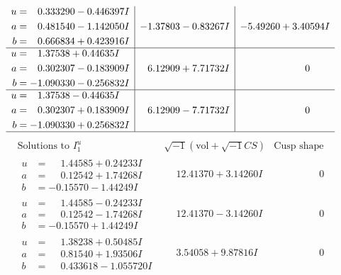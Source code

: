 \documentclass[1p]{elsarticle_modified}
\theoremstyle{definition}
\newcommand{\I}{\sqrt{-1}}
\begin{document}
$$\begin{array}{c|c|c}
\begin{aligned}
u &= \phantom{-}0.333290 - 0.446397 I \\
a &= \phantom{-}0.481540 - 1.142050 I \\
b &= \phantom{-}0.666834 + 0.423916 I\end{aligned}
 & -1.37803 - 0.83267 I & -5.49260 + 3.40594 I \\ \hline\begin{aligned}
u &= \phantom{-}1.37538 + 0.44635 I \\
a &= \phantom{-}0.302307 - 0.183909 I \\
b &= -1.090330 - 0.256832 I\end{aligned}
 & \phantom{-}6.12909 + 7.71732 I & \phantom{-0.000000 } 0 \\ \hline\begin{aligned}
u &= \phantom{-}1.37538 - 0.44635 I \\
a &= \phantom{-}0.302307 + 0.183909 I \\
b &= -1.090330 + 0.256832 I\end{aligned}
 & \phantom{-}6.12909 - 7.71732 I & \phantom{-0.000000 } 0\\
 \hline 
 \end{array}$$\newpage$$\begin{array}{c|c|c}  
\text{Solutions to }I^u_{1}& \I (\text{vol} + \sqrt{-1}CS) & \text{Cusp shape}\\
 \hline 
\begin{aligned}
u &= \phantom{-}1.44585 + 0.24233 I \\
a &= \phantom{-}0.12542 + 1.74268 I \\
b &= -0.15570 - 1.44249 I\end{aligned}
 & \phantom{-}12.41370 + 3.14260 I & \phantom{-0.000000 } 0 \\ \hline\begin{aligned}
u &= \phantom{-}1.44585 - 0.24233 I \\
a &= \phantom{-}0.12542 - 1.74268 I \\
b &= -0.15570 + 1.44249 I\end{aligned}
 & \phantom{-}12.41370 - 3.14260 I & \phantom{-0.000000 } 0 \\ \hline\begin{aligned}
u &= \phantom{-}1.38238 + 0.50485 I \\
a &= \phantom{-}0.81540 + 1.93506 I \\
b &= \phantom{-}0.433618 - 1.055720 I\end{aligned}
 & \phantom{-}3.54058 + 9.87816 I & \phantom{-0.000000 } 0 \\ \hline\begin{aligned}

\end{aligned}
\end{array}$$
\end{document}
